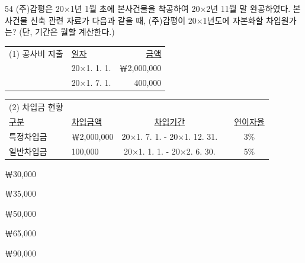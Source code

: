 \begin{question}{54}
(주)감평은 20×1년 1월 초에 본사건물을 착공하여 20×2년 11월 말 완공하였다. 본사건물 신축 관련 자료가 다음과 같을 때, (주)감평이 20×1년도에 자본화할 차입원가는? (단, 기간은 월할 계산한다.)
\begin{framedtext}
{\small\centering\begin{tabular}{@{}llr@{}}
(1) 공사비 지출 & \uline{일자} & \uline{금액} \\[2pt]
 & 20×1. 1. 1. & ￦2,000,000 \\
 & 20×1. 7. 1. & 400,000 \\
\end{tabular}\par}
\vspace{4pt}
\par{\small\centering\begin{tabular}{@{}llccc@{}}
(2) 차입금 현황 & & & & \\
\uline{구분} & \uline{차입금액} & \uline{차입기간} & & \uline{연이자율} \\[2pt]
특정차입금 & ￦2,000,000 & 20×1. 7. 1. - 20×1. 12. 31. & & 3\% \\
일반차입금 & 100,000 & 20×1. 1. 1. - 20×2. 6. 30. & & 5\% \\
\end{tabular}\par}
\end{framedtext}
\begin{choices}
  \item ￦30,000
  \item ￦35,000
  \item ￦50,000
  \item ￦65,000
  \item ￦90,000
\end{choices}
\end{question}
